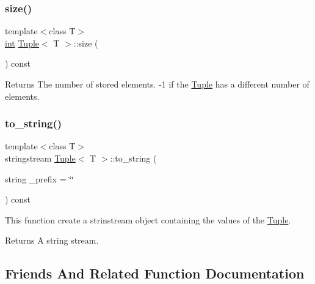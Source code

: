 \subsubsection{\texorpdfstring{size()}{size()}}
{\footnotesize\ttfamily template$<$class T$>$ \\
\mbox{\hyperlink{draw_8hh_aa620a13339ac3a1177c86edc549fda9b}{int}} \mbox{\hyperlink{class_tuple}{Tuple}}$<$ T $>$\+::size (\begin{DoxyParamCaption}{ }\end{DoxyParamCaption}) const\hspace{0.3cm}{\ttfamily [inline]}}

\begin{DoxyReturn}{Returns}
The number of stored elements. -\/1 if the \mbox{\hyperlink{class_tuple}{Tuple}} has a different number of elements. 
\end{DoxyReturn}
\mbox{\label{class_tuple_a029b06891c82353ae40c13199830e90a}} 
\subsubsection{\texorpdfstring{to\_string()}{to\_string()}}
{\footnotesize\ttfamily template$<$class T$>$ \\
stringstream \mbox{\hyperlink{class_tuple}{Tuple}}$<$ T $>$\+::to\+\_\+string (\begin{DoxyParamCaption}\item[{string}]{\+\_\+prefix = {\ttfamily \char`\"{}\char`\"{}} }\end{DoxyParamCaption}) const\hspace{0.3cm}{\ttfamily [inline]}}

This function create a strinstream object containing the values of the \mbox{\hyperlink{class_tuple}{Tuple}}. \begin{DoxyReturn}{Returns}
A string stream. 
\end{DoxyReturn}


\subsection{Friends And Related Function Documentation}
\mbox{\label{class_tuple_a2e6e2a2521038ab827ff2aa73023a53d}} 
